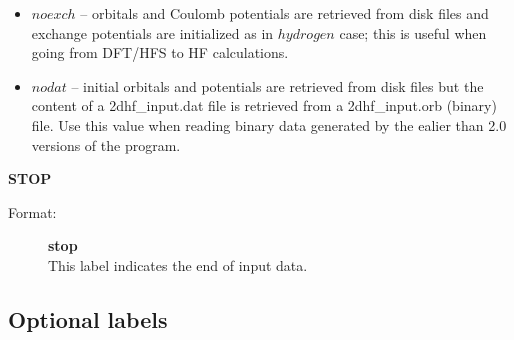 \documentclass[12pt,a4paper]{article}
\begin{document}
\begin{description}
\begin{description}
\begin{itemize}
\item $noexch$ -- orbitals and Coulomb potentials are retrieved from disk files and
  exchange potentials are initialized as in $hydrogen$ case; this is useful when going
  from DFT/HFS to HF calculations.

\item $nodat$ -- initial orbitals and potentials are retrieved from disk files but the
  content of a 2dhf\_input.dat file is retrieved from a 2dhf\_input.orb (binary) file. Use
  this value when reading binary data generated by the ealier than 2.0 versions of the
  program.

\end{itemize} 
\end{description}



\item \textbf{STOP}
\begin{description} 
\item[Format:] \textbf{stop}\\
This label indicates the end of input data.
\end{description} 

\end{description}
 

\newpage 

\subsection{Optional labels}
\end{document}
